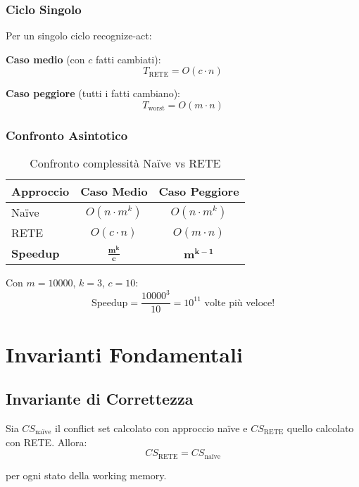 \subsubsection{Ciclo Singolo}

Per un singolo ciclo recognize-act:

\textbf{Caso medio} (con $c$ fatti cambiati):
\begin{equation}
T_{\text{RETE}} = O(c \cdot n)
\end{equation}

\textbf{Caso peggiore} (tutti i fatti cambiano):
\begin{equation}
T_{\text{worst}} = O(m \cdot n)
\end{equation}

\subsubsection{Confronto Asintotico}

\begin{table}[h]
\centering
\begin{tabular}{@{}lcc@{}}
\toprule
\textbf{Approccio} & \textbf{Caso Medio} & \textbf{Caso Peggiore} \\
\midrule
Naïve & $O(n \cdot m^k)$ & $O(n \cdot m^k)$ \\
RETE & $O(c \cdot n)$ & $O(m \cdot n)$ \\
\midrule
\textbf{Speedup} & $\mathbf{\frac{m^k}{c}}$ & $\mathbf{m^{k-1}}$ \\
\bottomrule
\end{tabular}
\caption{Confronto complessità Naïve vs RETE}
\label{tab:complexity_comparison}
\end{table}

Con $m=10000$, $k=3$, $c=10$:
\begin{equation}
\text{Speedup} = \frac{10000^3}{10} = 10^{11} \text{ volte più veloce!}
\end{equation}

\section{Invarianti Fondamentali}

\subsection{Invariante di Correttezza}

\begin{teorema}
\label{thm:rete_correctness}
Sia $CS_{\text{naïve}}$ il conflict set calcolato con approccio naïve e $CS_{\text{RETE}}$ quello calcolato con RETE. Allora:
\begin{equation}
CS_{\text{RETE}} = CS_{\text{naïve}}
\end{equation}

per ogni stato della working memory.
\end{teorema}

